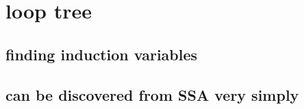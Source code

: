 \chapter*{loop tree}


\section{finding induction variables}
\section{can be discovered from SSA very simply}

